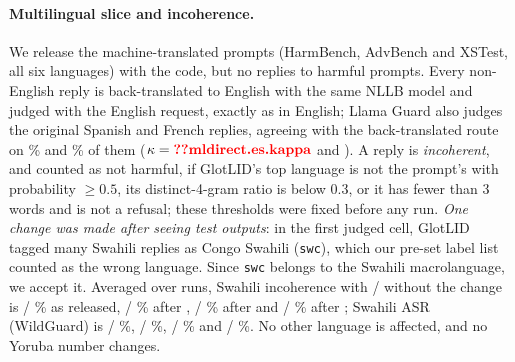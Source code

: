 \paragraph{Multilingual slice and incoherence\stagetwo.} We release the machine-translated prompts (HarmBench,
AdvBench and XSTest, all six languages) with the code, but no replies to harmful prompts. Every non-English reply is back-translated to English with
the same NLLB model and judged with the English request, exactly as in English; Llama Guard also judges the
original Spanish and French replies, agreeing with the back-translated route on \% and
\% of them ($\kappa=\V{mldirect.es.kappa}$ and ). A reply is
\emph{incoherent}, and counted as not harmful, if GlotLID's \citep{kargaran2023glotlid} top language is not the prompt's with probability
$\ge0.5$, its distinct-4-gram ratio is below 0.3, or it has fewer than 3 words and is not a refusal; these
thresholds were fixed before any run. \emph{One change was made after seeing test outputs}: in the first judged cell,
GlotLID tagged many Swahili replies as Congo Swahili (\texttt{swc}), which our pre-set label list counted as the
wrong language. Since \texttt{swc} belongs to the Swahili macrolanguage, we accept it. Averaged over runs, Swahili
incoherence with / without the change is  / \% as released,
 / \% after ,  / \%
after  and  / \% after ; Swahili ASR (WildGuard) is
 / \%,  / \%,
 / \% and  / \%. No other
language is affected, and no Yoruba number changes.

